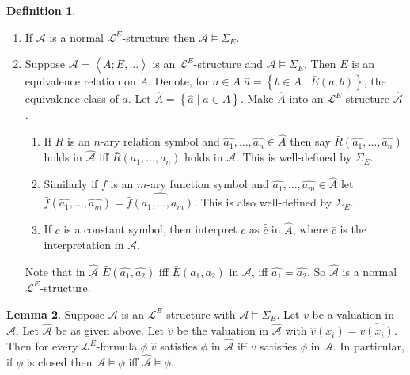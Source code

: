 \documentclass{article}
\newcommand{\rb}[1]{\left( #1 \right)}
\newcommand{\cb}[1]{\left\{ #1 \right\}}
\newcommand{\ab}[1]{\left\langle #1 \right\rangle}
\theoremstyle{definition}\newtheorem{definition}{Definition}[subsection]
\theoremstyle{definition}\newtheorem{remark}[definition]{Remark}
\theoremstyle{definition}\newtheorem*{example}{Example}
\theoremstyle{definition}\newtheorem*{note}{Note}
\newtheorem{lemma}[definition]{Lemma}
\begin{document}
\begin{definition}
\hfill
\begin{enumerate}
\item If $ \mathcal{A} $ is a normal $ \mathcal{L}^E $-structure then $ \mathcal{A} \vDash \Sigma_E $.
\item Suppose $ \mathcal{A} = \ab{A; \bar{E}, \dots} $ is an $ \mathcal{L}^E $-structure and $ \mathcal{A} \vDash \Sigma_E $. Then $ \bar{E} $ is an equivalence relation on $ A $. Denote, for $ a \in A $ $ \hat{a} = \cb{b \in A \mid \bar{E}\rb{a, b}} $, the equivalence class of $ a $. Let $ \hat{A} = \cb{\hat{a} \mid a \in A} $. Make $ \hat{A} $ into an $ \mathcal{L}^E $-structure $ \hat{\mathcal{A}} $.
\begin{enumerate}
\item If $ R $ is an $ n $-ary relation symbol and $ \hat{a_1}, \dots, \hat{a_n} \in \hat{A} $ then say $ \bar{R}\rb{\hat{a_1}, \dots, \hat{a_n}} $ holds in $ \hat{\mathcal{A}} $ iff $ \bar{R}\rb{a_1, \dots, a_n} $ holds in $ \mathcal{A} $. This is well-defined by $ \Sigma_E $.
\item Similarly if $ f $ is an $ m $-ary function symbol and $ \hat{a_1}, \dots, \hat{a_m} \in \hat{A} $ let $ \bar{f}\rb{\hat{a_1}, \dots, \hat{a_m}} = \widehat{\bar{f}\rb{a_1, \dots, a_m}} $. This is also well-defined by $ \Sigma_E $.
\item If $ c $ is a constant symbol, then interpret $ c $ as $ \hat{\bar{c}} $ in $ \hat{A} $, where $ \bar{c} $ is the interpretation in $ \mathcal{A} $.
\end{enumerate}
Note that in $ \hat{\mathcal{A}} $ $ \bar{E}\rb{\hat{a_1}, \hat{a_2}} $ iff $ \bar{E}\rb{a_1, a_2} $ in $ \mathcal{A} $, iff $ \hat{a_1} = \hat{a_2} $. So $ \hat{\mathcal{A}} $ is a normal $ \mathcal{L}^E $-structure.
\end{enumerate}
\end{definition}

\begin{lemma}
\label{lem:2.6.3}
Suppose $ \mathcal{A} $ is an $ \mathcal{L}^E $-structure with $ \mathcal{A} \vDash \Sigma_E $. Let $ v $ be a valuation in $ \mathcal{A} $. Let $ \hat{\mathcal{A}} $ be as given above. Let $ \hat{v} $ be the valuation in $ \hat{\mathcal{A}} $ with $ \hat{v}\rb{x_i} = \widehat{v\rb{x_i}} $. Then for every $ \mathcal{L}^E $-formula $ \phi $ $ \hat{v} $ satisfies $ \phi $ in $ \hat{\mathcal{A}} $ iff $ v $ satisfies $ \phi $ in $ \mathcal{A} $. In particular, if $ \phi $ is closed then $ \mathcal{A} \vDash \phi $ iff $ \hat{\mathcal{A}} \vDash \phi $.
\end{lemma}
\end{document}
